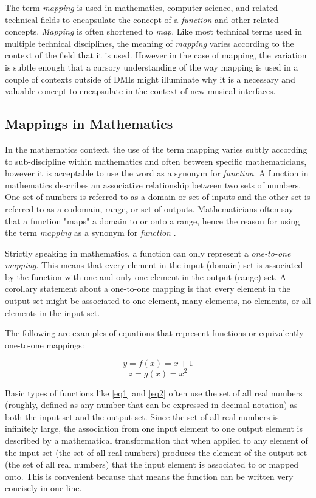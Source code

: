 The term \emph{mapping} is used in mathematics, computer science, and related technical fields to encapsulate the concept of a \emph{function} and other related concepts. \emph{Mapping} is often shortened to \emph{map}. Like most technical terms used in multiple technical disciplines, the meaning of \emph{mapping} varies according to the context of the field that it is used. However in the case of mapping, the variation is subtle enough that a cursory understanding of the way mapping is used in a couple of contexts outside of DMIs might illuminate why it is a necessary and valuable concept to encapsulate in the context of new musical interfaces.

\subsection{Mappings in Mathematics}

In the mathematics context, the use of the term mapping varies subtly according to sub-discipline within mathematics and often between specific mathematicians, however it is acceptable to use the word as a synonym for \emph{function}. A function in mathematics describes an associative relationship between two sets of numbers. One set of numbers is referred to as a domain or set of inputs and the other set is referred to as a codomain, range, or set of outputs. Mathematicians often say that a function "maps" a domain to or onto a range, hence the reason for using the term \emph{mapping} as a synonym for \emph{function} \cite{functionMapping}.

Strictly speaking in mathematics, a function can only represent a \emph{one-to-one mapping}. This means that every element in the input (domain) set is associated by the function with one and only one element in the output (range) set. A corollary statement about a one-to-one mapping is that every element in the output set might be associated to one element, many elements, no elements, or all elements in the input set.

The following are examples of equations that represent functions or equivalently one-to-one mappings:

\begin{equation} \label{eq1}
y = f(x) = x + 1
\end{equation}
\begin{equation} \label{eq2}
z = g(x) = x^{2}
\end{equation}

Basic types of functions like \ref{eq1} and \ref{eq2} often use the set of all real numbers (roughly, defined as any number that can be expressed in decimal notation) as both the input set and the output set. Since the set of all real numbers is infinitely large, the association from one input element to one output element is described by a mathematical transformation that when applied to any element of the input set (the set of all real numbers) produces the element of the output set (the set of all real numbers) that the input element is associated to or mapped onto. This is convenient because that means the function can be written very concisely in one line. 

